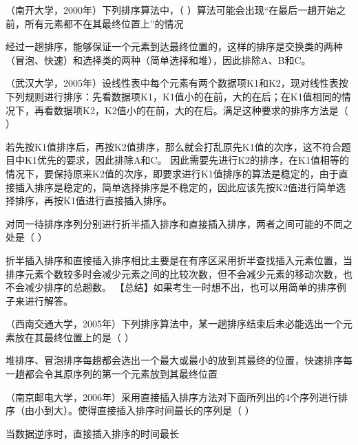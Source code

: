 \question （南开大学，2000年）下列排序算法中，（
）算法可能会出现``在最后一趟开始之前，所有元素都不在其最终位置上''的情况
\par{}
\begin{solution}经过一趟排序，能够保证一个元素到达最终位置的，这样的排序是交换类的两种（冒泡、快速）和选择类的两种（简单选择和堆），因此排除A、B和C。
\end{solution}
\question （武汉大学，2005年）设线性表中每个元素有两个数据项K1和K2，现对线性表按下列规则进行排序：先看数据项K1，K1值小的在前，大的在后；在K1值相同的情况下，再看数据项K2，K2值小的在前，大的在后。满足这种要求的排序方法是（
）
\par{}
\begin{solution}若先按K1值排序后，再按K2值排序，那么就会打乱原先K1值的次序，这不符合题目中K1优先的要求，因此排除A和C。
因此需要先进行K2的排序，在K1值相等的情况下，要保持原来K2值的次序，即要求进行K1值排序的算法是稳定的，由于直接插入排序是稳定的，简单选择排序是不稳定的，因此应该先按K2值进行简单选择排序，再按K1值进行直接插入排序。
\end{solution}
\question 对同一待排序序列分别进行折半插入排序和直接插入排序，两者之间可能的不同之处是（
）
\par{}
\begin{solution}折半插入排序和直接插入排序相比主要是在有序区采用折半查找插入元素位置，当排序元素个数较多时会减少元素之间的比较次数，但不会减少元素的移动次数，也不会减少排序的总趟数。
【总结】如果考生一时想不出，也可以用简单的排序例子来进行解答。
\end{solution}
\question （西南交通大学，2005年）下列排序算法中，某一趟排序结束后未必能选出一个元素放在其最终位置上的是（
）
\par{}
\begin{solution}堆排序、冒泡排序每趟都会选出一个最大或最小的放到其最终的位置，快速排序每一趟都会令其原序列的第一个元素放到其最终位置
\end{solution}
\question （南京邮电大学，2006年）采用直接插入排序方法对下面所列出的4个序列进行排序（由小到大）。使得直接插入排序时间最长的序列是（
）
\par{}
\begin{solution}当数据逆序时，直接插入排序的时间最长
\end{solution}
